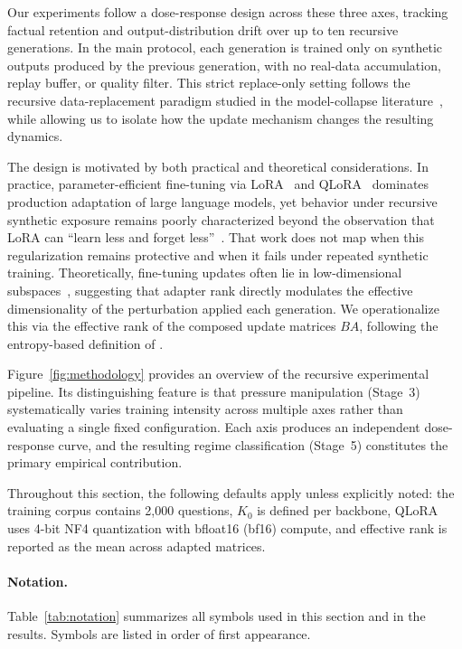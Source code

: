 \documentclass[a4paper,fleqn]{cas-dc}
\begin{document}
Our experiments follow a dose-response design across these three axes, tracking
factual retention and output-distribution drift over up to ten recursive
generations. In the main protocol, each generation is trained only on synthetic
outputs produced by the previous generation, with no real-data accumulation,
replay buffer, or quality filter. This strict replace-only setting follows the
recursive data-replacement paradigm studied in the model-collapse
literature~\citep{shumailov2024,dohmatob2025,gerstgrasser2024}, while allowing
us to isolate how the update mechanism changes the resulting dynamics.

The design is motivated by both practical and theoretical considerations. In
practice, parameter-efficient fine-tuning via LoRA~\citep{hu2022} and
QLoRA~\citep{dettmers2023} dominates production adaptation of large language
models, yet behavior under recursive synthetic exposure remains poorly
characterized beyond the observation that LoRA can ``learn less and forget
less''~\citep{biderman2024}. That work does not map when this regularization
remains protective and when it fails under repeated synthetic training.
Theoretically, fine-tuning updates often lie in low-dimensional
subspaces~\citep{aghajanyan2021}, suggesting that adapter rank directly
modulates the effective dimensionality of the perturbation applied each
generation. We operationalize this via the effective rank of the composed update
matrices $BA$, following the entropy-based definition of
\citet{roy2007}.

Figure~\ref{fig:methodology} provides an overview of the recursive experimental
pipeline. Its distinguishing feature is that pressure manipulation (Stage~3)
systematically varies training intensity across multiple axes rather than
evaluating a single fixed configuration. Each axis produces an independent
dose-response curve, and the resulting regime classification (Stage~5)
constitutes the primary empirical contribution.

Throughout this section, the following defaults apply unless explicitly noted:
the training corpus contains 2{,}000 questions, $K_0$ is defined per backbone,
QLoRA uses 4-bit NF4 quantization with bfloat16 (bf16) compute, and effective rank is
reported as the mean across adapted matrices.

\paragraph{Notation.}
Table~\ref{tab:notation} summarizes all symbols used in this section and in
the results.  Symbols are listed in order of first appearance.
\end{document}
